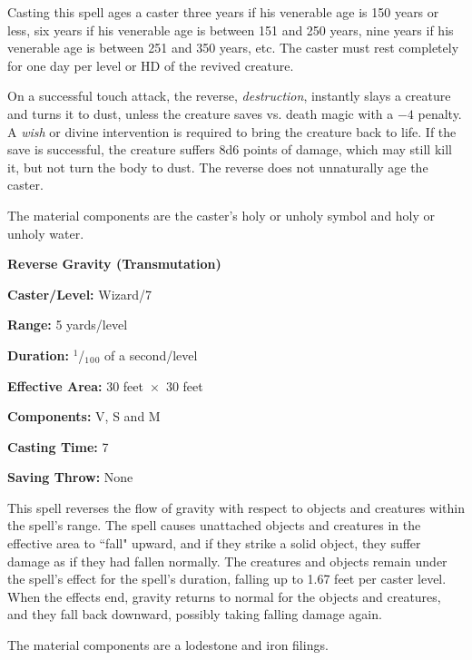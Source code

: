 \begin{multicols}{2}
Casting this spell ages a caster three years if his venerable age is 150 years or less, six years if his venerable age is between 151 and 250 years, nine years if his venerable age is between 251 and 350 years, etc.  The caster must rest completely for one day per level or HD of the revived creature.  

On a successful touch attack, the reverse, \textit{destruction}, instantly slays a creature and turns it to dust, unless the creature saves vs. death magic with a $-4$ penalty.  A \textit{wish} or divine intervention is required to bring the creature back to life.  If the save is successful, the creature suffers 8d6 points of damage, which may still kill it, but not turn the body to dust.  The reverse does not unnaturally age the caster.

The material components are the caster's holy or unholy symbol and holy or unholy water. 

\vspace{1em}

\noindent
\begin{minipage}{\columnwidth}

\noindent \textbf{Reverse Gravity (Transmutation)}

\noindent \textbf{Caster/Level:} Wizard/7

\noindent \textbf{Range:} 5 yards/level

\noindent \textbf{Duration:} $^1$/$_1$$_0$$_0$ of a second/level

\noindent \textbf{Effective Area:} 30 feet~$\times$~30 feet

\noindent \textbf{Components:} V, S and M

\noindent \textbf{Casting Time:} 7

\noindent \textbf{Saving Throw:} None

\end{minipage}

This spell reverses the flow of gravity with respect to objects and creatures within the spell's range.  The spell causes unattached objects and creatures in the effective area to ``fall" upward, and if they strike a solid object, they suffer damage as if they had fallen normally.  The creatures and objects remain under the spell's effect for the spell's duration, falling up to 1.67 feet per caster level.  When the effects end, gravity returns to normal for the objects and creatures, and they fall back downward, possibly taking falling damage again.  

The material components are a lodestone and iron filings.  
 

\end{multicols}
